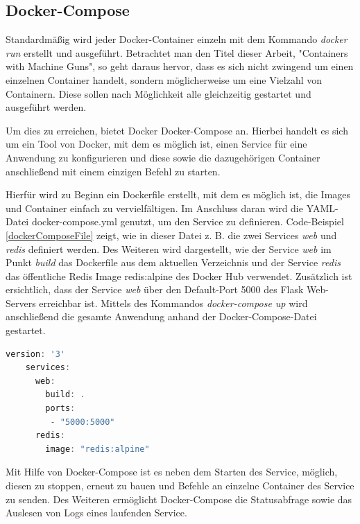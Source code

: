 \subsection{Docker-Compose}

Standardmäßig wird jeder Docker-Container einzeln mit dem Kommando \textit{docker run} erstellt und ausgeführt.
Betrachtet man den Titel dieser Arbeit, "Containers with Machine Guns", so geht daraus hervor, dass es sich nicht zwingend um einen einzelnen Container handelt, sondern möglicherweise um eine Vielzahl von Containern.
Diese sollen nach Möglichkeit alle gleichzeitig gestartet und ausgeführt werden.

Um dies zu erreichen, bietet Docker Docker-Compose an.
Hierbei handelt es sich um ein Tool von Docker, mit dem es möglich ist, einen Service für eine Anwendung zu konfigurieren und diese sowie die dazugehörigen Container anschließend mit einem einzigen Befehl zu starten.

Hierfür wird zu Beginn ein Dockerfile erstellt, mit dem es möglich ist, die Images und Container einfach zu vervielfältigen.
Im Anschluss daran wird die YAML-Datei docker-compose.yml genutzt, um den Service zu definieren.
Code-Beispiel \ref{dockerComposeFile} zeigt, wie in dieser Datei z. B. die zwei Services \textit{web} und \textit{redis} definiert werden.
Des Weiteren wird dargestellt, wie der Service \textit{web} im Punkt \textit{build} das Dockerfile aus dem aktuellen Verzeichnis und der Service \textit{redis} das öffentliche Redis Image \glqq{}redis:alpine\grqq{} des Docker Hub verwendet.
Zusätzlich ist ersichtlich, dass der Service \textit{web} über den Default-Port 5000 des Flask Web-Servers erreichbar ist.
Mittels des Kommandos \textit{docker-compose up} wird anschließend die gesamte Anwendung anhand der Docker-Compose-Datei gestartet.

\begin{minipage}{\linewidth}
	\begin{lstlisting}[frame=single,caption=Beispiel Docker Compose Datei \cite{Docker:online2}, label=dockerComposeFile, language=Scala]
	version: '3'
	services:
	  web:
	    build: .
	    ports:
	     - "5000:5000"
	  redis:
	    image: "redis:alpine"
	\end{lstlisting}
\end{minipage}

Mit Hilfe von Docker-Compose ist es neben dem Starten des Service, möglich, diesen zu stoppen, erneut zu bauen und Befehle an einzelne Container des Service zu senden.
Des Weiteren ermöglicht Docker-Compose die Statusabfrage sowie das Auslesen von Logs eines laufenden Service.

